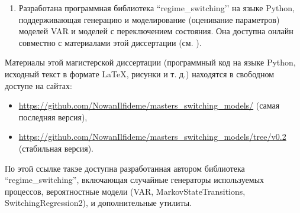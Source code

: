 \documentclass[a4paper,14pt]{extreport}
\newcommand{\coderepo}{https://github.com/NowanIlfideme/masters_switching_models}
\newcommand{\codeversion}{v0.2}
\newcommand{\genurl}[1]{\url{\coderepo/#1}}
\begin{document}
\begin{enumerate}
	      \begin{enumerate}
		      \item Главное преимущество вероятностного программирования заключается в возможности использования одного и того же автоматизированного алгоритма (MCMC/NUTS) для оценивания параметров модели; необходимо определить только байесовский граф модели и функцию правдоподобия для соответствующих процессов \footnote{По сравнению с классическим вариантом, где необходимо менять алгоритм оценивания при значительном изменении формулировки процессов. }.
		      \item Однако существуют и некоторые недостатки: время работы алгоритмов семплирования MCMC значительно дольше даже классических итерационных, и проблема ``label switching’’ (перескок классов внутри цепи MCMC) для моделей с векторными параметрами всё еще является препятствием для стабильной работы и сходимости этих алгоритмов.
	      \end{enumerate}
	\item Разработана программная библиотека ``regime\_switching’’ на языке Python, поддерживающая генерацию и моделирование (оценивание параметров) моделей VAR и моделей с переключением состояния. Она доступна онлайн совместно с материалами этой диссертации (см. ).
\end{enumerate}


\printbibliography[title=Список использованных источников]


\appendix
{}

\label{appendix}

Материалы этой магистерской диссертации (программный код на языке Python, исходный текст в формате \LaTeX, рисунки и т. д.) находятся в свободном доступе на сайтах:

\begin{itemize}
	\item \genurl{} (самая последняя версия),
	\item \genurl{tree/\codeversion} (стабильная версия).
\end{itemize}

По этой ссылке такэе доступна разработанная автором библиотека ``regime\_switching'', включающая случайные генераторы используемых процессов, вероятностные модели (VAR, MarkovStateTransitions, SwitchingRegression2), и дополнительные утилиты.
\end{document}
